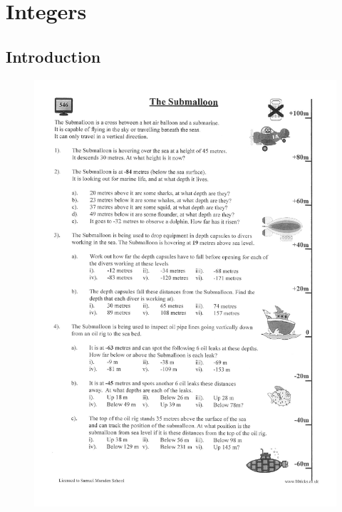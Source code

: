 \documentclass[a4paper,12pt]{article}
\begin{document}
\section{Integers}
\subsection{Introduction}\label{submalloon}

\begin{figure}[!h]
	\centering
	\includegraphics[width=17cm]{Submalloon}
\end{figure}


\newpage
\end{document}
